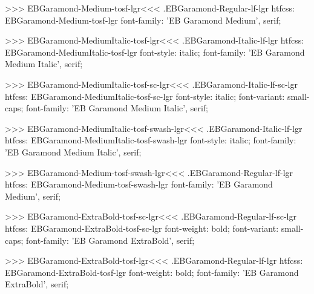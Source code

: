 >>>
\<EBGaramond-Medium-tosf-lgr\><<<
.EBGaramond-Regular-lf-lgr
htfcss:  EBGaramond-Medium-tosf-lgr  font-family: 'EB Garamond Medium', serif;

>>>
\<EBGaramond-MediumItalic-tosf-lgr\><<<
.EBGaramond-Italic-lf-lgr
htfcss:  EBGaramond-MediumItalic-tosf-lgr  font-style: italic; font-family: 'EB Garamond Medium Italic', serif;

>>>
\<EBGaramond-MediumItalic-tosf-sc-lgr\><<<
.EBGaramond-Italic-lf-sc-lgr
htfcss:  EBGaramond-MediumItalic-tosf-sc-lgr  font-style: italic; font-variant: small-caps; font-family: 'EB Garamond Medium Italic', serif;

>>>
\<EBGaramond-MediumItalic-tosf-swash-lgr\><<<
.EBGaramond-Italic-lf-lgr
htfcss:  EBGaramond-MediumItalic-tosf-swash-lgr  font-style: italic; font-family: 'EB Garamond Medium Italic', serif;

>>>
\<EBGaramond-Medium-tosf-swash-lgr\><<<
.EBGaramond-Regular-lf-lgr
htfcss:  EBGaramond-Medium-tosf-swash-lgr  font-family: 'EB Garamond Medium', serif;

>>>
\<EBGaramond-ExtraBold-tosf-sc-lgr\><<<
.EBGaramond-Regular-lf-sc-lgr
htfcss:  EBGaramond-ExtraBold-tosf-sc-lgr  font-weight: bold; font-variant: small-caps; font-family: 'EB Garamond ExtraBold', serif;

>>>
\<EBGaramond-ExtraBold-tosf-lgr\><<<
.EBGaramond-Regular-lf-lgr
htfcss:  EBGaramond-ExtraBold-tosf-lgr  font-weight: bold; font-family: 'EB Garamond ExtraBold', serif;

